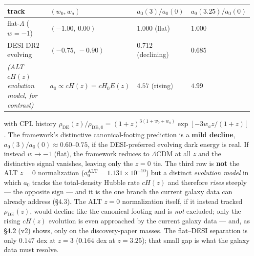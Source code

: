 \documentclass[
]{article}
\newcounter{none} %
\begin{document}
{\def\LTcaptype{none} %
\begin{longtable}[]{@{}
  >{\raggedright\arraybackslash}p{}
  >{\raggedright\arraybackslash}p{}
  >{\raggedright\arraybackslash}p{}
  >{\raggedright\arraybackslash}p{}@{}}
\toprule\noalign{}
\begin{minipage}[b]{\linewidth}\raggedright
track
\end{minipage} & \begin{minipage}[b]{\linewidth}\raggedright
\((w_0,w_a)\)
\end{minipage} & \begin{minipage}[b]{\linewidth}\raggedright
\(a_0(3)/a_0(0)\)
\end{minipage} & \begin{minipage}[b]{\linewidth}\raggedright
\(a_0(3.25)/a_0(0)\)
\end{minipage} \\
\midrule\noalign{}
\endhead
\bottomrule\noalign{}
\endlastfoot
flat-\(\Lambda\) (\(w=-1\)) & \((-1.00,\,0.00)\) & \(1.000\) (flat) &
\(1.000\) \\
DESI-DR2 evolving & \((-0.75,\,-0.90)\) & \(0.712\) (declining) &
\(0.685\) \\
\emph{(ALT \(cH(z)\) evolution model, for contrast)} &
\(a_0\propto cH(z)=cH_0E(z)\) & \(4.57\) (rising) & \(4.99\) \\
\end{longtable}
}

with CPL history
\(\rho_\mathrm{DE}(z)/\rho_\mathrm{DE,0}=(1+z)^{3(1+w_0+w_a)}\exp[-3w_az/(1+z)]\).
The framework's distinctive canonical-footing prediction is a
\textbf{mild decline}, \(a_0(3)/a_0(0)\approx0.60\)--\(0.75\), if the
DESI-preferred evolving dark energy is real. If instead \(w\to-1\)
(flat), the framework reduces to \(\Lambda\)CDM at all \(z\) and the
distinctive signal vanishes, leaving only the \(z=0\) tie. The third row
is \textbf{not} the ALT \(z=0\) normalization
(\(a_0^\mathrm{ALT}=1.131\times10^{-10}\)) but a distinct \emph{evolution
model} in which \(a_0\) tracks the total-density Hubble rate \(cH(z)\)
and therefore \emph{rises} steeply --- the opposite sign --- and it is
the one branch the current galaxy data can already address (§4.3). The
ALT \(z=0\) normalization itself, if it instead tracked
\(\rho_\mathrm{DE}(z)\), would decline like the canonical footing and is
\emph{not} excluded; only the rising \(cH(z)\) evolution is even
approached by the current galaxy data --- and, as §4.2 (v2) shows, only
on the discovery-paper masses. The flat--DESI separation is only
\(0.147\) dex at \(z=3\) (\(0.164\) dex at \(z=3.25\)); that small gap
is what the galaxy data must resolve.
\end{document}
